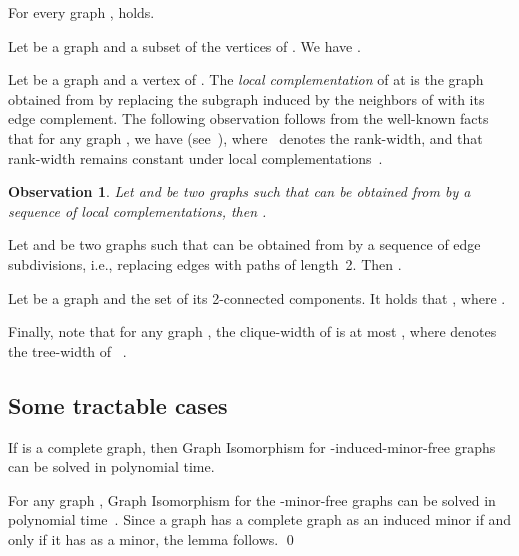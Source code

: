 \documentclass[envcountsame,envcountsect,11pt,a4paper]{llncs}
\renewenvironment{proof}{\begin{Proof}}{\qed\end{Proof}}
\newtheorem{observation}[theorem]{Observation}
\begin{document}
\begin{theorem}
\label{thm:cw-complement}
For every graph ,  holds.
\end{theorem}

\begin{theorem}
\label{thm:cw-vertex-deletion}
Let  be a graph and  a subset of the vertices of . We have .
\end{theorem}

Let  be a graph and  a vertex of . The {\em local complementation} of  at  is the graph obtained from  by replacing the subgraph induced by the neighbors of  with its edge complement. The following observation follows from the well-known facts that for any graph , we have  (see~\cite{OS06}), where~ denotes the rank-width,  and that rank-width remains constant under local complementations~\cite{Oum05}.

\begin{observation}
\label{obs:cw-local-complementation}
Let  and  be two graphs such that  can be obtained from  by a sequence of local complementations, then .
\end{observation}

\begin{theorem}
\label{thm:cw-subdivision}
Let  and  be two graphs such that  can be obtained from  by a sequence of edge subdivisions, i.e., replacing edges with paths of length~2. Then .
\end{theorem}

\begin{theorem}
\label{thm:cw-blocks}
Let  be a graph and  the set of its 2-connected components. It holds that , where .
\end{theorem}

Finally, note that for any graph , the clique-width of  is at most , where  denotes the tree-width of ~\cite{CR05}.

\subsection{Some tractable cases}
\begin{lemma}
If  is a complete graph,
then {\sc Graph Isomorphism} for -induced-minor-free graphs can be solved in polynomial time.
\end{lemma}
\begin{proof}
For any graph ,
{\sc Graph Isomorphism} for the -minor-free graphs can be solved in polynomial time~\cite{Ponomarenko88}.
Since a graph has a complete graph  as an induced minor
if and only if it has  as a minor, the lemma follows.
\end{proof}
\end{document}

